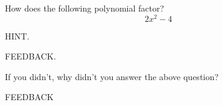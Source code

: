 \documentclass{ximera}
\begin{document}
\begin{problem} 
\begin{problem}
    How does the following polynomial factor?
    $$2x^2 - 4$$
    
    \begin{hint}
    HINT.
    \end{hint}
    
  \begin{multipleChoice}
      
      \begin{feedback}[attempt]
      FEEDBACK.
      \end{feedback}
  \end{multipleChoice}
  
\end{problem}
\begin{question}

    If you didn't, why didn't you answer the above question?

  \begin{multipleChoice}
      
     \begin{feedback}[attempt]
     FEEDBACK
     \end{feedback}
     
  \end{multipleChoice}
\end{question}
\end{problem}
\end{document}
